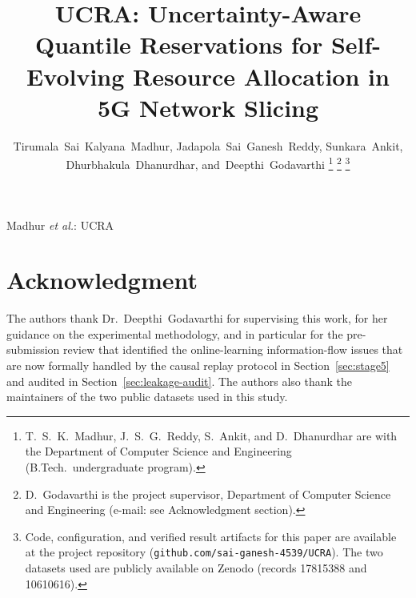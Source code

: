 \documentclass[journal]{IEEEtran}
\begin{document}
\title{UCRA: Uncertainty-Aware Quantile Reservations for Self-Evolving
Resource Allocation in 5G Network Slicing}

\author{Tirumala~Sai~Kalyana~Madhur,
        Jadapola~Sai~Ganesh~Reddy,
        Sunkara~Ankit,
        Dhurbhakula~Dhanurdhar,
        and~Deepthi~Godavarthi%
\thanks{T.~S.~K.~Madhur, J.~S.~G.~Reddy, S.~Ankit, and
D.~Dhanurdhar are with the Department of Computer Science and
Engineering (B.Tech.\ undergraduate program).}%
\thanks{D.~Godavarthi is the project supervisor, Department of
Computer Science and Engineering
(e-mail: see Acknowledgment section).}%
\thanks{Code, configuration, and verified result artifacts for this
paper are available at the project repository
(\texttt{github.com/sai-ganesh-4539/UCRA}). The two datasets used are
publicly available on Zenodo (records 17815388 and 10610616).}}

%
{Madhur \MakeLowercase{\textit{et al.}}: UCRA}

\maketitle














\section*{Acknowledgment}
The authors thank Dr.\ Deepthi~Godavarthi for supervising this work,
for her guidance on the experimental methodology, and in particular for
the pre-submission review that identified the online-learning
information-flow issues that are now formally handled by the causal
replay protocol in Section~\ref{sec:stage5} and audited in
Section~\ref{sec:leakage-audit}. The authors also thank the maintainers
of the two public datasets used in this study.



\end{document}
